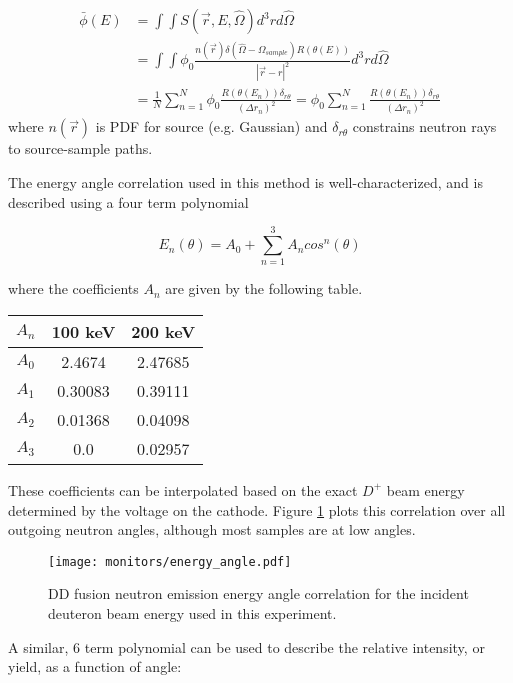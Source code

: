 \documentclass[aps,twocolumn,secnumarabic,balancelastpage,amsmath,amssymb,nofootinbib,floatfix]{revtex4-1}
\begin{document}
\begin{align*}
\bar{\phi}(E) &= \int \int S(\vec{r},E,\hat{\Omega})d^3rd\hat{\Omega} \\
              &= \int \int \phi_0 \frac{n(\vec{r})\delta (\hat{\Omega}-\Omega_{sample})R(\theta(E))}{|\vec{r}-r|^2} d^3rd\hat{\Omega} \\
              &= \frac{1}{N} \sum_{n=1}^{N} \phi_0 \frac{R(\theta(E_n))\delta_{r\theta}}{(\Delta r_n)^2} = \phi_0 \sum_{n=1}^{N} \frac{R(\theta(E_n))\delta_{r\theta}}{(\Delta r_n)^2}
\end{align*}
where $n(\vec{r})$ is PDF for source (e.g. Gaussian) and $\delta_{r\theta}$ constrains neutron rays to source-sample paths.

The energy angle correlation used in this method is well-characterized, and is described using a four term polynomial

\begin{equation}
E_n(\theta) = A_0 + \sum_{n=1}^3 A_n cos^n(\theta)
\end{equation}

where the coefficients $A_n$ are given by the following table. \\

\begin{ruledtabular}
\begin{tabular}{ccc}
$A_n$ & 100 keV & 200 keV \\ 
\hline 
$A_0$ & 2.4674 & 2.47685 \\ 
$A_1$ & 0.30083 & 0.39111 \\ 
$A_2$ & 0.01368 & 0.04098 \\ 
$A_3$ & 0.0 & 0.02957 \\ 
\end{tabular}
\end{ruledtabular}

These coefficients can be interpolated based on the exact $D^+$ beam energy determined by the voltage on the cathode.  Figure \ref{fig:energy_angle} plots this correlation over all outgoing neutron angles, although most samples are at low angles.

\begin{figure}[htb]
\texttt{[image: monitors/energy\_angle.pdf]}
\caption{DD fusion neutron emission energy angle correlation for the incident deuteron beam energy used in this experiment.
}
\label{fig:energy_angle}
\end{figure}

A similar, 6 term polynomial can be used to describe the relative intensity, or yield, as a function of angle:
\end{document}
